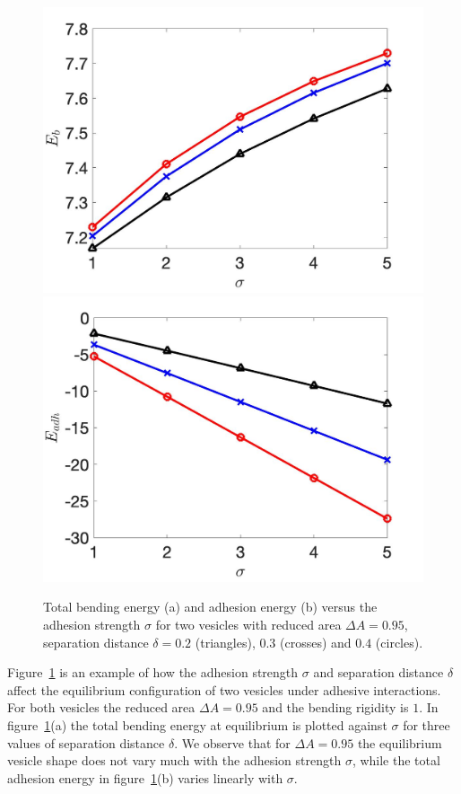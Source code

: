 \documentclass[aps,prl,twocolumn,showpacs,amsmath,amssymb]{revtex4-1}
\begin{document}
\begin{figure}
\includegraphics[keepaspectratio=true,scale=0.18]{figs/Dec18_Eb_vs_sigma_rA0p9502.jpeg}
\includegraphics[keepaspectratio=true,scale=0.18]{figs/Dec18_Eadh_vs_sigma_rA0p9502.jpeg}
\caption{Total bending energy (a) and adhesion energy (b) versus the adhesion strength $\sigma$ 
for two vesicles with reduced area $\Delta A=0.95$, separation distance $\delta = 0.2$ (triangles), $0.3$ (crosses)
and $0.4$ (circles). }
\label{fig:Dec18_equilibrium} 
\end{figure}
%
Figure~\ref{fig:Dec18_equilibrium} is an example of how the adhesion strength $\sigma$ and separation distance $\delta$ affect the equilibrium configuration of two vesicles under adhesive interactions.
For both vesicles the reduced area $\Delta A=0.95$ and the bending rigidity is $1$.
In figure~\ref{fig:Dec18_equilibrium}(a) 
the total bending energy at equilibrium is plotted against $\sigma$ for three values of separation distance $\delta$.
We observe that for $\Delta A=0.95$ the equilibrium vesicle shape does not vary much with the adhesion strength $\sigma$, while the total adhesion energy in figure~\ref{fig:Dec18_equilibrium}(b) varies linearly
with $\sigma$.
\end{document}
